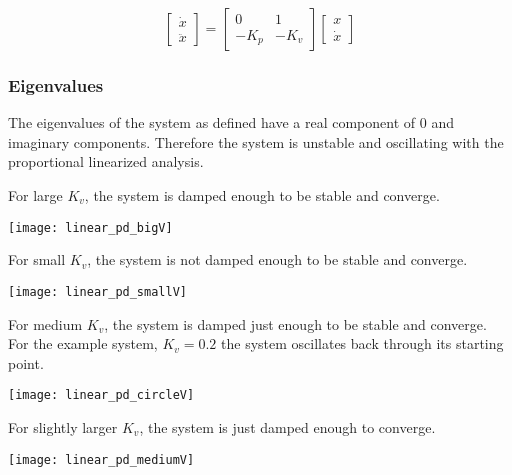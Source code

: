 \documentclass[12pt, letterpaper, oneside, notitlepage, onecolumn]{article}
\begin{document}
\begin{equation}
\begin{bmatrix}
\dot{x} \\
\ddot{x}
\end{bmatrix}
=
\begin{bmatrix}
0 & 1 \\
-K_{p} & -K_{v}
\end{bmatrix}
%
\begin{bmatrix}
x \\
\dot{x}
\end{bmatrix}
\end{equation}

\subsubsection{Eigenvalues}

The eigenvalues of the system as defined have a real component of 0 and
imaginary components. Therefore the system is unstable and oscillating with the
proportional linearized analysis.

For large $K_{v}$, the system is damped enough to be stable and converge.

\begin{center}
\texttt{[image: linear\_pd\_bigV]}
\end{center}

For small $K_{v}$, the system is not damped enough to be stable and converge.

\begin{center}
\texttt{[image: linear\_pd\_smallV]}
\end{center}

For medium $K_{v}$, the system is damped just enough to be stable and
converge. For the example system, $K_{v} = 0.2$ the system oscillates back
through its starting point.

\begin{center}
\texttt{[image: linear\_pd\_circleV]}
\end{center}

For slightly larger $K_{v}$, the system is just damped enough to converge.

\begin{center}
\texttt{[image: linear\_pd\_mediumV]}
\end{center}
\end{document}

